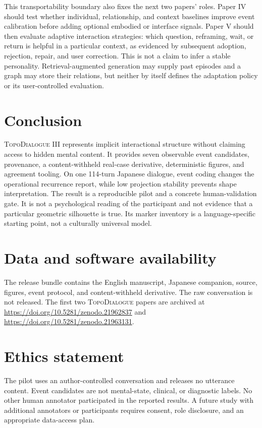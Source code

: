\documentclass[11pt]{article}
\newcommand{\system}{\textsc{TopoDialogue}}
\begin{document}
This transportability boundary also fixes the next two papers' roles. Paper IV
should test whether individual, relationship, and context baselines improve
event calibration before adding optional embodied or interface signals. Paper V
should then evaluate adaptive interaction strategies: which question,
reframing, wait, or return is helpful in a particular context, as evidenced by
subsequent adoption, rejection, repair, and user correction. This is not a
claim to infer a stable personality. Retrieval-augmented generation may supply
past episodes and a graph may store their relations, but neither by itself
defines the adaptation policy or its user-controlled evaluation.

\section{Conclusion}

\system{} III represents implicit interactional structure without claiming
access to hidden mental content. It provides seven observable event candidates,
provenance, a content-withheld real-case derivative, deterministic figures, and
agreement tooling. On one 114-turn Japanese dialogue, event coding changes the
operational recurrence report, while low projection stability prevents shape
interpretation. The result is a reproducible pilot and a concrete human-validation
gate. It is not a psychological reading of the participant and not evidence
that a particular geometric silhouette is true. Its marker inventory is a
language-specific starting point, not a culturally universal model.

\section*{Data and software availability}

The release bundle contains the English manuscript, Japanese companion, source,
figures, event protocol, and content-withheld derivative. The raw conversation
is not released. The first two \system{} papers are archived at
\url{https://doi.org/10.5281/zenodo.21962837} and
\url{https://doi.org/10.5281/zenodo.21963131}.

\section*{Ethics statement}

The pilot uses an author-controlled conversation and releases no utterance
content. Event candidates are not mental-state, clinical, or diagnostic labels.
No other human annotator participated in the reported results. A future study
with additional annotators or participants requires consent, role disclosure,
and an appropriate data-access plan.



\end{document}
